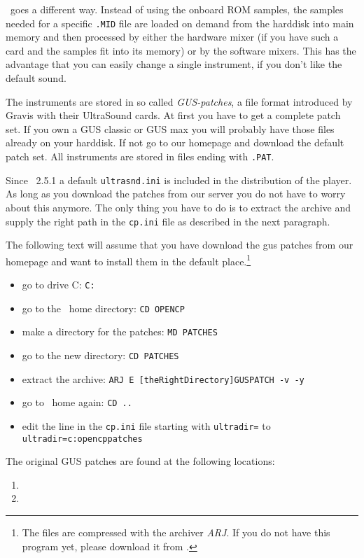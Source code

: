 \cp\ goes a different way. Instead of using the onboard ROM samples, the samples
needed for a specific \texttt{.MID} file are loaded on demand from the harddisk
into main memory and then processed by either the hardware mixer (if you have
such a card and the samples fit into its memory) or by the software mixers.
This has the advantage that you can easily change a single instrument, if you
don't like the default sound.

The instruments are stored in so called \emph{GUS-patches}, a file format
introduced by Gravis with their UltraSound cards. At first you have to get a
complete patch set. If you own a GUS classic or GUS max you will probably have
those files already on your harddisk. If not go to our homepage and download
the default patch set. All instruments are stored in files ending with
\texttt{.PAT}.

Since \cp\ 2.5.1 a default \texttt{ultrasnd.ini} is included in the
distribution of the player. As long as you download the patches from our
server you do not have to worry about this anymore. The only thing you have
to do is to extract the archive and supply the right path in the \texttt{cp.ini}
file as described in the next paragraph.

The following text will assume that you have download the gus patches from our
homepage and want to install them in the default place.\footnote{The files are
compressed with the archiver \emph{ARJ}. If you do not have this program yet,
please download it from .}
\begin{itemize}
\item go to drive C: \texttt{C:}
\item go to the \cp\ home directory: \texttt{CD OPENCP}
\item make a directory for the patches: \texttt{MD PATCHES}
\item go to the new directory: \texttt{CD PATCHES}
\item extract the archive: \texttt{ARJ E [theRightDirectory]GUSPATCH -v -y}
\item go to \cp\ home again: \texttt{CD ..}
\item edit the line in the \texttt{cp.ini} file starting with
\texttt{ultradir=} to \\ \texttt{ultradir=c:opencppatches}
\end{itemize}

The original GUS patches are found at the following locations:
\begin{enumerate}
\item {}
\item {}
\end{enumerate}

